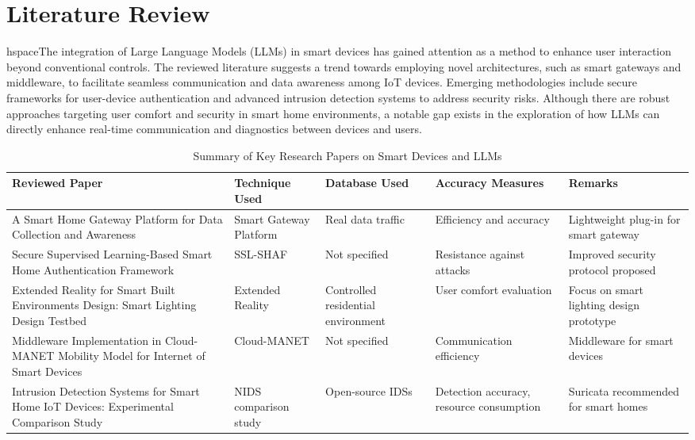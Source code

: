 \documentclass[conference]{IEEEtran}
\begin{document}
\section{Literature Review}
hspace{}The integration of Large Language Models (LLMs) in smart devices has gained attention as a method to enhance user interaction beyond conventional controls. The reviewed literature suggests a trend towards employing novel architectures, such as smart gateways and middleware, to facilitate seamless communication and data awareness among IoT devices. Emerging methodologies include secure frameworks for user-device authentication and advanced intrusion detection systems to address security risks. Although there are robust approaches targeting user comfort and security in smart home environments, a notable gap exists in the exploration of how LLMs can directly enhance real-time communication and diagnostics between devices and users.

\begin{table}[h]
    \centering
    \begin{tabular}{|p{1.3cm}|p{1.3cm}|p{1.3cm}|p{1.3cm}|p{1.3cm}|}
        \hline
        \textbf{Reviewed Paper} & \textbf{Technique Used} & \textbf{Database Used} & \textbf{Accuracy Measures} & \textbf{Remarks} \\ \hline
        A Smart Home Gateway Platform for Data Collection and Awareness & Smart Gateway Platform & Real data traffic & Efficiency and accuracy & Lightweight plug-in for smart gateway \\ \hline
        Secure Supervised Learning-Based Smart Home Authentication Framework & SSL-SHAF & Not specified & Resistance against attacks & Improved security protocol proposed \\ \hline
        Extended Reality for Smart Built Environments Design: Smart Lighting Design Testbed & Extended Reality & Controlled residential environment & User comfort evaluation & Focus on smart lighting design prototype \\ \hline
        Middleware Implementation in Cloud-MANET Mobility Model for Internet of Smart Devices & Cloud-MANET & Not specified & Communication efficiency & Middleware for smart devices \\ \hline
        Intrusion Detection Systems for Smart Home IoT Devices: Experimental Comparison Study & NIDS comparison study & Open-source IDSs & Detection accuracy, resource consumption & Suricata recommended for smart homes \\ \hline
    \end{tabular}
    \caption{Summary of Key Research Papers on Smart Devices and LLMs}
    \label{tab:research_summary}
\end{table}
\end{document}
